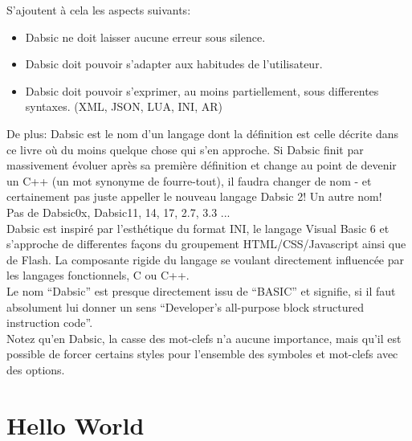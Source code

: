 \documentclass[a5paper, 12pt]{book}
\begin{document}
\newpage

S'ajoutent à cela les aspects suivants:\\

\begin{itemize}
  \item Dabsic ne doit laisser aucune erreur sous silence.
  \item Dabsic doit pouvoir s'adapter aux habitudes de l'utilisateur.
  \item Dabsic doit pouvoir s'exprimer, au moins partiellement, sous
    differentes syntaxes. (XML, JSON, LUA, INI, AR)
\end{itemize}

\vspace{\baselineskip}

De plus: Dabsic est le nom d'un langage dont la définition est
celle décrite dans ce livre où du moins quelque chose qui
s'en approche. Si Dabsic finit par massivement évoluer après sa
première définition et change au point de devenir un C++ (un mot
synonyme de fourre-tout), il faudra changer de nom - et certainement
pas juste appeller le nouveau langage Dabsic 2! Un autre nom!\\

Pas de Dabsic0x, Dabsic11, 14, 17, 2.7, 3.3 ...\\

Dabsic est inspiré par l'esthétique du format INI, le langage Visual Basic 6 et
s'approche de differentes façons du groupement
HTML/CSS/Javascript ainsi que de Flash. La composante rigide
du langage se voulant directement influencée par les langages
fonctionnels, C ou C++.\\

Le nom ``Dabsic'' est presque directement issu de ``BASIC'' et signifie,
si il faut absolument lui donner un sens ``Developer's all-purpose block structured
instruction code''.\\

Notez qu'en Dabsic, la casse des mot-clefs n'a aucune importance, mais
qu'il est possible de forcer certains styles pour l'ensemble des
symboles et mot-clefs avec des options.


\chapter{Hello World}
\end{document}
